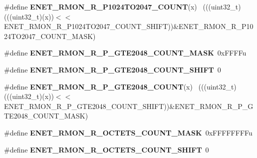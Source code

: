 \begin{DoxyCompactItemize}
\item 
\hypertarget{group___e_n_e_t___register___masks_ga1c3c200bc38e76c8147cd1defe5732c0}{}\#define {\bfseries E\+N\+E\+T\+\_\+\+R\+M\+O\+N\+\_\+\+R\+\_\+\+P1024\+T\+O2047\+\_\+\+C\+O\+U\+N\+T}(x)              ~(((uint32\+\_\+t)(((uint32\+\_\+t)(x))$<$$<$E\+N\+E\+T\+\_\+\+R\+M\+O\+N\+\_\+\+R\+\_\+\+P1024\+T\+O2047\+\_\+\+C\+O\+U\+N\+T\+\_\+\+S\+H\+I\+F\+T))\&E\+N\+E\+T\+\_\+\+R\+M\+O\+N\+\_\+\+R\+\_\+\+P1024\+T\+O2047\+\_\+\+C\+O\+U\+N\+T\+\_\+\+M\+A\+S\+K)\label{group___e_n_e_t___register___masks_ga1c3c200bc38e76c8147cd1defe5732c0}

\item 
\hypertarget{group___e_n_e_t___register___masks_gaf5df4a669f61146ee44ed2f49360b952}{}\#define {\bfseries E\+N\+E\+T\+\_\+\+R\+M\+O\+N\+\_\+\+R\+\_\+\+P\+\_\+\+G\+T\+E2048\+\_\+\+C\+O\+U\+N\+T\+\_\+\+M\+A\+S\+K}~0x\+F\+F\+F\+Fu\label{group___e_n_e_t___register___masks_gaf5df4a669f61146ee44ed2f49360b952}

\item 
\hypertarget{group___e_n_e_t___register___masks_ga904cd13cbfecbb28ad3eb52c05fd3df0}{}\#define {\bfseries E\+N\+E\+T\+\_\+\+R\+M\+O\+N\+\_\+\+R\+\_\+\+P\+\_\+\+G\+T\+E2048\+\_\+\+C\+O\+U\+N\+T\+\_\+\+S\+H\+I\+F\+T}~0\label{group___e_n_e_t___register___masks_ga904cd13cbfecbb28ad3eb52c05fd3df0}

\item 
\hypertarget{group___e_n_e_t___register___masks_ga6f7bc24dd49be45a420707650f2a089d}{}\#define {\bfseries E\+N\+E\+T\+\_\+\+R\+M\+O\+N\+\_\+\+R\+\_\+\+P\+\_\+\+G\+T\+E2048\+\_\+\+C\+O\+U\+N\+T}(x)                  ~(((uint32\+\_\+t)(((uint32\+\_\+t)(x))$<$$<$E\+N\+E\+T\+\_\+\+R\+M\+O\+N\+\_\+\+R\+\_\+\+P\+\_\+\+G\+T\+E2048\+\_\+\+C\+O\+U\+N\+T\+\_\+\+S\+H\+I\+F\+T))\&E\+N\+E\+T\+\_\+\+R\+M\+O\+N\+\_\+\+R\+\_\+\+P\+\_\+\+G\+T\+E2048\+\_\+\+C\+O\+U\+N\+T\+\_\+\+M\+A\+S\+K)\label{group___e_n_e_t___register___masks_ga6f7bc24dd49be45a420707650f2a089d}

\item 
\hypertarget{group___e_n_e_t___register___masks_ga31948c93e2594b779db5084f7c65a294}{}\#define {\bfseries E\+N\+E\+T\+\_\+\+R\+M\+O\+N\+\_\+\+R\+\_\+\+O\+C\+T\+E\+T\+S\+\_\+\+C\+O\+U\+N\+T\+\_\+\+M\+A\+S\+K}~0x\+F\+F\+F\+F\+F\+F\+F\+Fu\label{group___e_n_e_t___register___masks_ga31948c93e2594b779db5084f7c65a294}

\item 
\hypertarget{group___e_n_e_t___register___masks_ga048e6dcb8662f710b44101a65f6bc6c8}{}\#define {\bfseries E\+N\+E\+T\+\_\+\+R\+M\+O\+N\+\_\+\+R\+\_\+\+O\+C\+T\+E\+T\+S\+\_\+\+C\+O\+U\+N\+T\+\_\+\+S\+H\+I\+F\+T}~0\label{group___e_n_e_t___register___masks_ga048e6dcb8662f710b44101a65f6bc6c8}


\end{DoxyCompactItemize}
